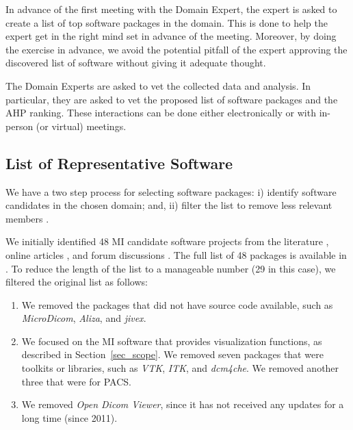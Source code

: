 \documentclass[3p, 12pt,authoryear]{elsarticle}
\begin{document}
In advance of the first meeting with the Domain Expert, the expert is asked to
create a list of top software packages in the domain.  This is done to help
the expert get in the right mind set in advance of the meeting.  Moreover,
by doing the exercise in advance, we avoid the potential pitfall of the expert
approving the discovered list of software without giving it adequate thought.

The Domain Experts are asked to vet the collected data and analysis.  In
particular, they are asked to vet the proposed list of software packages and the
AHP ranking.  These interactions can be done either electronically or with
in-person (or virtual) meetings.

\subsection{List of Representative Software} \label{sec_software_selection}

We have a two step process for selecting software packages: i) identify
software candidates in the chosen domain; and, ii) filter the list to remove less relevant members \citep{SmithEtAl2021}.

We initially identified 48 MI candidate software projects from the literature
\citep{Bjorn2017, Bruhschwein2019, Haak2015}, online articles \citep{Emms2019,
Hasan2020, Mu2019}, and forum discussions \citep{Samala2014}.  The full list of
48 packages is available in \citet{Dong2021}.  To reduce the length of the list
to a manageable number (29 in this case), we filtered the original list as
follows:

\begin{enumerate}

\item We removed the packages that did not have source code available, such as
\textit{MicroDicom}, \textit{Aliza}, and \textit{jivex}.

\item We focused on the MI software that provides visualization functions, as
described in Section~\ref{sec_scope}. We removed seven packages that were
toolkits or libraries, such as \textit{VTK}, \textit{ITK}, and \textit{dcm4che}.
We removed another three that were for PACS.

\item We removed \textit{Open Dicom Viewer}, since it has not received any
updates for a long time (since 2011).

\end{enumerate}
\end{document}
